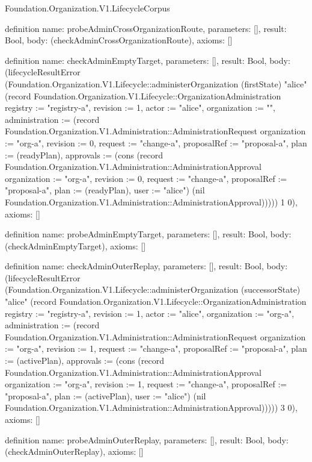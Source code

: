 \begin{lexlean}{Foundation.Organization.V1.LifecycleCorpus}
\begin{semanticmodule}
definition{
  name: probeAdminCrossOrganizationRoute,
  parameters: [],
  result: Bool,
  body: (checkAdminCrossOrganizationRoute),
  axioms: []
}

definition{
  name: checkAdminEmptyTarget,
  parameters: [],
  result: Bool,
  body: (lifecycleResultError (Foundation.Organization.V1.Lifecycle::administerOrganization (firstState) "alice" (record Foundation.Organization.V1.Lifecycle::OrganizationAdministration {registry := "registry-a", revision := 1, actor := "alice", organization := "", administration := (record Foundation.Organization.V1.Administration::AdministrationRequest {organization := "org-a", revision := 0, request := "change-a", proposalRef := "proposal-a", plan := (readyPlan), approvals := (cons (record Foundation.Organization.V1.Administration::AdministrationApproval {organization := "org-a", revision := 0, request := "change-a", proposalRef := "proposal-a", plan := (readyPlan), user := "alice"}) (nil Foundation.Organization.V1.Administration::AdministrationApproval))})})) 1 0),
  axioms: []
}

definition{
  name: probeAdminEmptyTarget,
  parameters: [],
  result: Bool,
  body: (checkAdminEmptyTarget),
  axioms: []
}

definition{
  name: checkAdminOuterReplay,
  parameters: [],
  result: Bool,
  body: (lifecycleResultError (Foundation.Organization.V1.Lifecycle::administerOrganization (successorState) "alice" (record Foundation.Organization.V1.Lifecycle::OrganizationAdministration {registry := "registry-a", revision := 1, actor := "alice", organization := "org-a", administration := (record Foundation.Organization.V1.Administration::AdministrationRequest {organization := "org-a", revision := 1, request := "change-a", proposalRef := "proposal-a", plan := (activePlan), approvals := (cons (record Foundation.Organization.V1.Administration::AdministrationApproval {organization := "org-a", revision := 1, request := "change-a", proposalRef := "proposal-a", plan := (activePlan), user := "alice"}) (nil Foundation.Organization.V1.Administration::AdministrationApproval))})})) 3 0),
  axioms: []
}

definition{
  name: probeAdminOuterReplay,
  parameters: [],
  result: Bool,
  body: (checkAdminOuterReplay),
  axioms: []
}


\end{semanticmodule}
\end{lexlean}
